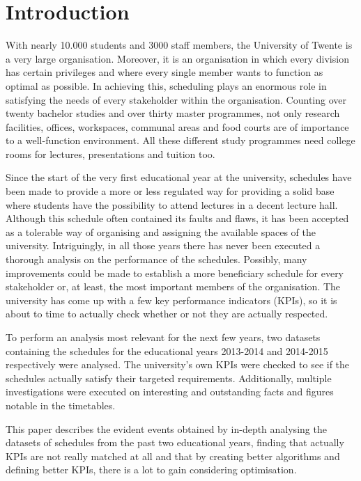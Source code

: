 \section{Introduction}
With nearly 10.000 students and 3000 staff members, the University of Twente is a very large organisation\cite{stats_uTwente}. Moreover, it is an organisation in which every division has certain privileges and where every single member wants to function as optimal as possible. In achieving this, scheduling plays an enormous role in satisfying the needs of every stakeholder within the organisation. Counting over twenty bachelor studies and over thirty master programmes, not only research facilities, offices, workspaces, communal areas and food courts are of importance to a well-function environment. All these different study programmes need college rooms for lectures, presentations and tuition too.

Since the start of the very first educational year at the university, schedules have been made to provide a more or less regulated way for providing a solid base where students have the possibility to attend lectures in a decent lecture hall. Although this schedule often contained its faults and flaws, it has been accepted as a tolerable way of organising and assigning the available spaces of the university. Intriguingly, in all those years there has never been executed a thorough analysis on the performance of the schedules. Possibly, many improvements could be made to establish a more beneficiary schedule for every stakeholder or, at least, the most important members of the organisation. The university has come up with a few key performance indicators (KPIs), so it is about to time to actually check whether or not they are actually respected.

To perform an analysis most relevant for the next few years, two datasets containing the schedules for the educational years 2013-2014 and 2014-2015 respectively were analysed. The university’s own KPIs were checked to see if the schedules actually satisfy their targeted requirements. Additionally, multiple investigations were executed on interesting and outstanding facts and figures notable in the timetables.

This paper describes the evident events obtained by in-depth analysing the datasets of schedules from the past two educational years, finding that actually KPIs are not really matched at all and that by creating better algorithms and defining better KPIs, there is a lot to 
gain considering optimisation.